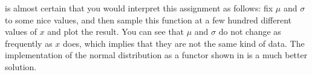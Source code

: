 is almost certain that you would interpret this assignment as follows: fix $\mu$ and $\sigma$
to some nice values, and then sample this function at a few hundred different values of $x$ and
plot the result. You can see that $\mu$ and $\sigma$ do not change as frequently as $x$ does,
which implies that they are not the same kind of data. The implementation of the normal
distribution as a functor shown in  is a much better solution.
%
%






